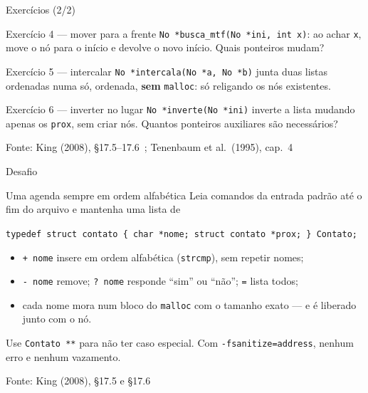 \documentclass[aspectratio=169]{beamer}
\newcommand{\fonte}[1]{\vfill\hfill{\scriptsize\textcolor{UFSGray}{Fonte: #1}}}
\begin{document}
\begin{frame}{Exercícios (2/2)}
  \footnotesize
  \begin{block}{Exercício 4 --- mover para a frente}
    \texttt{No *busca\_mtf(No *ini, int x)}: ao achar \texttt{x}, move o
    nó para o início e devolve o novo início. Quais ponteiros mudam?
  \end{block}
  \begin{block}{Exercício 5 --- intercalar}
    \texttt{No *intercala(No *a, No *b)} junta duas listas ordenadas numa
    só, ordenada, \textbf{sem} \texttt{malloc}: só religando os nós
    existentes.
  \end{block}
  \begin{block}{Exercício 6 --- inverter no lugar}
    \texttt{No *inverte(No *ini)} inverte a lista mudando apenas os
    \texttt{prox}, sem criar nós. Quantos ponteiros auxiliares são
    necessários?
  \end{block}
  \fonte{King (2008), §17.5--17.6~\cite{king2008c};
    Tenenbaum et al.\ (1995), cap.~4~\cite{tenenbaum1995estruturas}}
\end{frame}

\begin{frame}{Desafio}
  \begin{block}{Uma agenda sempre em ordem alfabética}
    \small Leia comandos da entrada padrão até o fim do arquivo e mantenha
    uma lista de
    \begin{center}
      \texttt{typedef struct contato \{ char *nome; struct contato *prox; \} Contato;}
    \end{center}
    \vspace{-0.6em}
    \begin{itemize}
      \item \texttt{+ nome} insere em ordem alfabética (\texttt{strcmp}),
        sem repetir nomes;
      \item \texttt{- nome} remove; \texttt{? nome} responde ``sim'' ou
        ``não''; \texttt{=} lista todos;
      \item cada nome mora num bloco do \texttt{malloc} com o tamanho exato
        --- e é liberado junto com o nó.
    \end{itemize}
    Use \texttt{Contato **} para não ter caso especial. Com
    \texttt{-fsanitize=address}, nenhum erro e nenhum vazamento.
  \end{block}
  \fonte{King (2008), §17.5 e §17.6~\cite{king2008c}}
\end{frame}
\end{document}
